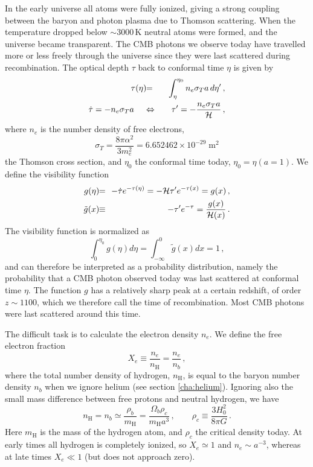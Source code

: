 \documentclass[twocolumn,nofootinbib,amsmath,amssymb]{revtex4}
\newcommand{\be}{\begin{equation}}
\newcommand{\ee}{\end{equation}}
\newcommand{\ba}{\begin{eqnarray}}
\newcommand{\ea}{\end{eqnarray}}
\newcommand{\hs}{\hspace{-1.12mm}}
\newcommand{\eq}{\hs & = & \hs}
\newcommand{\eqequiv}{\hs & \equiv & \hs}
\newcommand{\kelvin}{\mathrm{K}}
\newcommand{\meter}{\mathrm{m}}
\newcommand{\hydr}{\mathrm{H}}
\begin{document}
In the early universe all atoms were fully ionized, giving a strong coupling
between the baryon and photon plasma due to Thomson scattering. When the
temperature dropped below $\sim 3000 \,\kelvin$ neutral atoms were formed, and
the universe became transparent. The CMB photons we observe today have
travelled more or less freely through the universe since they were last
scattered during recombination. The optical depth $\tau$ back to conformal time
$\eta$ is given by~\cite{Dodelson}
\ba
  \tau(\eta) \eq \int_\eta^{\eta_0} n_e \sigma_T a \, d\eta' \, , \nonumber \\
  \dot{\tau} = -n_e \sigma_T a \, \quad &\Leftrightarrow& \quad
  \tau' = -\frac{n_e \sigma_T a}{{\cal H}} \, ,
\ea
where $n_e$ is the number density of free electrons,
\be
  \sigma_T = \frac{8\pi\alpha^2}{3 m_e^2} =
    6.652462 \times 10^{-29} \; \meter^2
\ee
the Thomson cross section, and $\eta_0$ the conformal time today, $\eta_0 =
\eta(a=1)$. We define the visibility function
\ba
  g(\eta) \eq -\dot{\tau} e^{-\tau(\eta)} =
    -{\cal H} \tau' e^{-\tau(x)} = g(x) \, , \nonumber \\
  \tilde{g}(x) \eqequiv -\tau' e^{-\tau} = \frac{g(x)}{{\cal H}(x)} \, .
\ea
The visibility function is normalized as
\be
  \int_0^{\eta_0} g(\eta) d\eta =
    \int_{-\infty}^0 \tilde{g}(x) dx = 1 \, ,
\ee
and can therefore be interpreted as a probability distribution, namely the
probability that a CMB photon observed today was last scattered at conformal
time $\eta$. The function $g$ has a relatively sharp peak at a certain
redshift, of order $z \sim 1100$, which we therefore call the time of
recombination. Most CMB photons were last scattered around this time.

The difficult task is to calculate the electron density $n_e$. We define the
free electron fraction
\be
  X_e \equiv \frac{n_e}{n_\hydr} = \frac{n_e}{n_b} \, ,
  \label{eq:electronfrac}
\ee
where the total number density of hydrogen, $n_\hydr$, is equal to the baryon
number density $n_b$ when we ignore helium (see section \ref{cha:helium}).
Ignoring also the small mass difference between free protons and neutral
hydrogen, we have
\be
  n_\hydr = n_b \simeq \frac{\rho_b}{m_\hydr} =
    \frac{\Omega_b \rho_c}{m_\hydr a^3} \, ,
  \qquad \rho_c \equiv \frac{3 H_0^2}{8\pi G} \, .
\ee
Here $m_\hydr$ is the mass of the hydrogen atom, and $\rho_c$ the critical
density today. At early times all hydrogen is completely ionized, so $X_e
\simeq 1$ and $n_e \sim a^{-3}$, whereas at late times $X_e \ll 1$ (but does
not approach zero).
\end{document}
